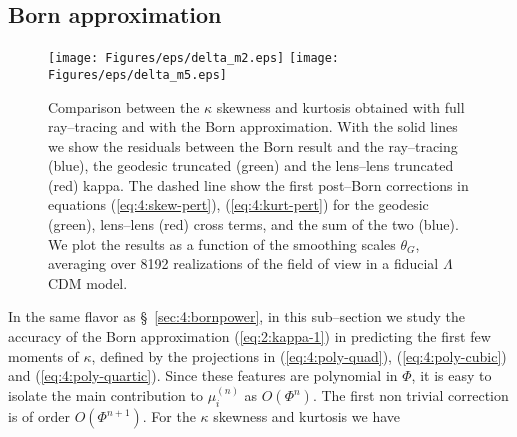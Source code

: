 \subsection{Born approximation}
%
\begin{figure}
\begin{center}
\texttt{[image: Figures/eps/delta\_m2.eps]}
\texttt{[image: Figures/eps/delta\_m5.eps]}
\end{center}
\caption{Comparison between the $\kappa$ skewness and kurtosis obtained with full ray--tracing and with the Born approximation. With the solid lines we show the residuals between the Born result and the ray--tracing (blue), the geodesic truncated (green) and the lens--lens truncated (red) kappa. The dashed line show the first post--Born corrections in equations (\ref{eq:4:skew-pert}), (\ref{eq:4:kurt-pert}) for the geodesic (green), lens--lens (red) cross terms, and the sum of the two (blue). We plot the results as a function of the smoothing scales $\theta_G$, averaging over 8192 realizations of the field of view in a fiducial $\Lambda$CDM model.}
\label{fig:4:momRes}
\end{figure}
%
In the same flavor as \S~\ref{sec:4:bornpower}, in this sub--section we study the accuracy of the Born approximation (\ref{eq:2:kappa-1}) in predicting the first few moments of $\kappa$, defined by the projections in (\ref{eq:4:poly-quad}), (\ref{eq:4:poly-cubic}) and (\ref{eq:4:poly-quartic}). Since these features are polynomial in $\Phi$, it is easy to isolate the main contribution to $\mu^{(n)}_i$ as $O(\Phi^n)$. The first non trivial correction is of order $O(\Phi^{n+1})$. For the $\kappa$ skewness and kurtosis we have 

